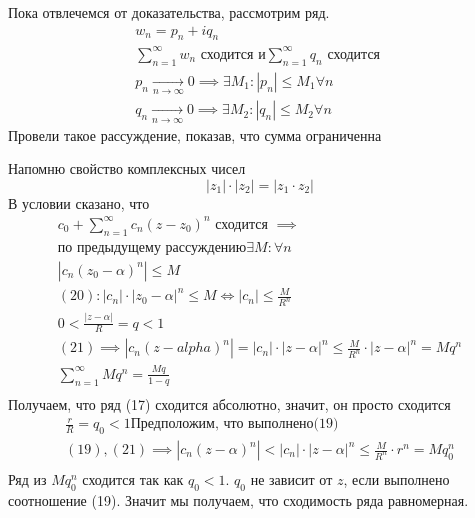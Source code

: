 \documentclass[main]{subfiles}
\begin{document}
Пока отвлечемся от доказательства, рассмотрим ряд.
    \begin{gather*}
        w_n = p_n + iq_n \\
        \sum^\infty_{n=1} w_n \text{ сходится } и
        \sum^\infty_{n=1} q_n \text{ сходится } \\
        p_n \underset{n \to \infty}{\longrightarrow} 0 \implies \exists M_1 : |p_n| \leq M_1 \forall n \\
        q_n \underset{n \to \infty}{\longrightarrow} 0 \implies \exists M_2 : |q_n| \leq M_2 \forall n
    \end{gather*}
    Провели такое рассуждение, показав, что сумма ограниченна
\begin{longProof}
    Напомню свойство комплексных чисел  
    \[|z_1| \cdot |z_2| = |z_1 \cdot z_2| \]
    В условии сказано, что 
    \begin{gather*}
        c_0 + \sum^\infty_{n=1} c_n(z-z_0)^n \text{ сходится } \implies\\
         \text{по предыдущему рассуждению} \exists M : \forall n \\
        |c_n(z_0 - \alpha)^n | \leq M \tag{20} \\
        (20) : |c_n| \cdot |z_0 - \alpha|^n \leq M \Leftrightarrow |c_n| \leq \frac{M}{R^n} \tag{21}\\
        0 < \frac{|z-\alpha|}{R} = q < 1 \\
        (21) \implies |c_n(z-alpha)^n | = |c_n| \cdot |z-\alpha|^n \leq \frac{M}{R^n} \cdot |z-\alpha|^n = Mq^n \tag{22}\\
        \sum^\infty_{n=1} Mq^n = \frac{Mq}{1-q} \\
    \end{gather*}
    Получаем, что ряд (17) сходится абсолютно, значит, он просто сходится
    \begin{gather*}
        \frac{r}{R} = q_0 < 1
        \text{Предположим, что выполнено(19)} \\
        (19),(21) \implies |c_n(z-\alpha)^n| < |c_n| \cdot |z-\alpha|^n \leq \frac{M}{R^n} \cdot r^n = Mq_0^n \tag{23}\\
    \end{gather*}
    Ряд из $Mq_0^n$ сходится так как $q_0< 1$.  $q_0$ не зависит от $z$, 
    если выполнено соотношение (19). Значит мы получаем, что сходимость ряда равномерная.
\end{longProof}
\end{document}
